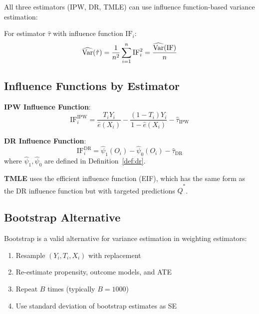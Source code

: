 All three estimators (IPW, DR, TMLE) can use influence function-based variance estimation:

\begin{definition}
For estimator $\hat{\tau}$ with influence function $\text{IF}_i$:
\begin{equation}
\widehat{\mathrm{Var}}(\hat{\tau}) = \frac{1}{n^2} \sum_{i=1}^{n} \text{IF}_i^2 = \frac{\widehat{\mathrm{Var}}(\text{IF})}{n}
\end{equation}
\end{definition}

\subsection{Influence Functions by Estimator}

\textbf{IPW Influence Function}:
\begin{equation}
\text{IF}_i^{\text{IPW}} = \frac{T_i Y_i}{\hat{e}(X_i)} - \frac{(1-T_i) Y_i}{1 - \hat{e}(X_i)} - \hat{\tau}_{\text{IPW}}
\end{equation}

\textbf{DR Influence Function}:
\begin{equation}
\text{IF}_i^{\text{DR}} = \hat{\psi}_1(O_i) - \hat{\psi}_0(O_i) - \hat{\tau}_{\text{DR}}
\end{equation}
where $\hat{\psi}_1, \hat{\psi}_0$ are defined in Definition~\ref{def:dr}.

\textbf{TMLE} uses the efficient influence function (EIF), which has the same form as the DR influence function but with targeted predictions $\hat{Q}^*$.

\subsection{Bootstrap Alternative}

Bootstrap is a valid alternative for variance estimation in weighting estimators:

\begin{enumerate}
    \item Resample $(Y_i, T_i, X_i)$ with replacement
    \item Re-estimate propensity, outcome models, and ATE
    \item Repeat $B$ times (typically $B = 1000$)
    \item Use standard deviation of bootstrap estimates as SE
\end{enumerate}

